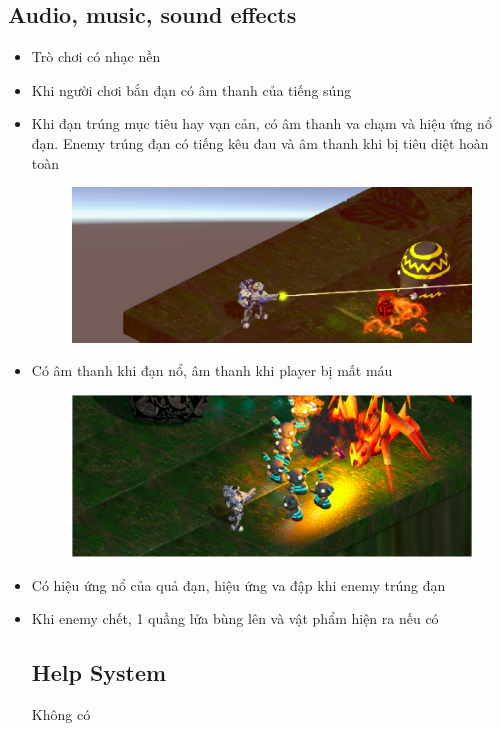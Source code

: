 \documentclass[../report.tex]{subfiles}
\begin{document}
\subsection{Audio, music, sound effects}
\begin{itemize}
\item Trò chơi có nhạc nền
\item Khi người chơi bắn đạn có âm thanh của tiếng súng
\item Khi đạn trúng mục tiêu hay vạn cản, có âm thanh va chạm và
hiệu ứng nổ đạn. Enemy trúng đạn có tiếng kêu đau và âm thanh khi bị tiêu diệt hoàn toàn
\begin{figure}[H]
\centering
\includegraphics[width=15cm]{figures/no.png}
\end{figure}

\item Có âm thanh khi đạn nổ, âm thanh khi player bị mất máu
\begin{figure}[H]
\centering
\includegraphics[width=15cm]{figures/no2.png}
\end{figure}


\item Có hiệu ứng nổ của quả đạn, hiệu ứng va đập khi enemy trúng đạn
\item Khi enemy chết, 1 quầng lửa bùng lên và vật phẩm hiện ra nếu có

\subsection{Help System}
Không có


\end{itemize}
\end{document}
